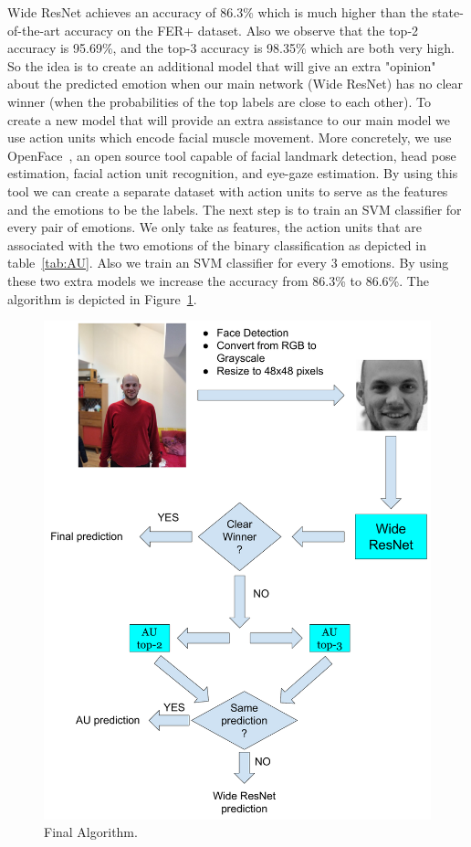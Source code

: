 Wide ResNet achieves an accuracy of 86.3\%  which is much higher than the state-of-the-art accuracy on the FER+ dataset. Also we observe that the top-2 accuracy is 95.69\%, and the top-3 accuracy is 98.35\% which are both very high. So the idea is to create an additional model that will give an extra "opinion" about the predicted emotion when our main network (Wide ResNet) has no clear winner (when the probabilities of the top labels are close to each other). To create a new model that will provide an extra assistance to our main model we use action units which encode facial muscle movement. More concretely, we use OpenFace~\cite{baltruvsaitis2016openface}, an open source tool capable of facial landmark detection, head pose estimation, facial action unit recognition, and eye-gaze estimation. By using this tool we can create a separate dataset with action units to serve as the features and the emotions to be the labels. The next step is to train an SVM classifier for every pair of emotions. We only take as features, the action units that are associated with the two emotions of the binary classification as depicted in table~\ref{tab:AU}. Also we train an SVM classifier for every 3 emotions. By using these two extra models we increase the accuracy from 86.3\% to 86.6\%. The algorithm is depicted in Figure~\ref{fig:final_model}.

 \begin{figure}[]
    \begin{center}
    \includegraphics[width=1.0\textwidth]{images/final_model.pdf}
    \end{center}
    \caption{Final Algorithm.} \label{fig:final_model}
\end{figure}